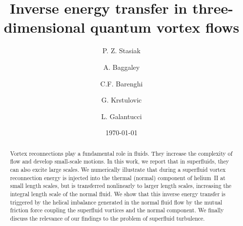\documentclass[%
 reprint,
 amsmath,amssymb,
 aps,
 prl,
]{revtex4-2}
\begin{document}

\title{Inverse energy transfer in three-dimensional quantum vortex flows}

\author{P. Z. Stasiak}
\author{A. Baggaley}
\author{C.F. Barenghi}

\author{G. Krstulovic}

\author{L. Galantucci}

\date{\today}%

\begin{abstract}
Vortex reconnections play a fundamental role in fluids.
They increase the complexity of flow and develop small-scale motions.
In this work, we report that in superfluids, they can also excite large scales.
We numerically illustrate that during a superfluid vortex reconnection energy 
is injected 
into the thermal (normal) component of helium~II at small length scales, but is transferred nonlinearly  to larger length scales, increasing the integral length scale of the normal
fluid.  
We show that this inverse energy transfer is triggered by the helical imbalance generated 
in the normal fluid flow by
the mutual friction force coupling the superfluid vortices and the normal component. We finally discuss
the relevance of our findings to 
the problem of superfluid turbulence.
\end{abstract}

\maketitle
\end{document}
